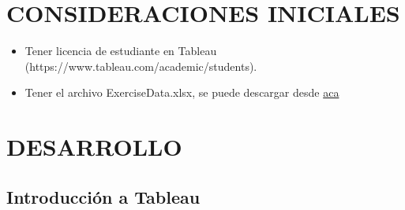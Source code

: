 \documentclass[12pt,letterpaper]{article}
\begin{document}
    \section{CONSIDERACIONES INICIALES}
    \begin{itemize}
        \item Tener licencia de estudiante en Tableau (\textcolor{azul}{https://www.tableau.com/academic/students}).
        \item Tener el archivo ExerciseData.xlsx, se puede descargar desde \textcolor{azul}{\href{https://learning.qlik.com/mod/resource/view.php?id=22519}{aca}}
    \end{itemize}
    \newpage
    \section{DESARROLLO}
    \subsection{Introducción a Tableau}
\end{document}

